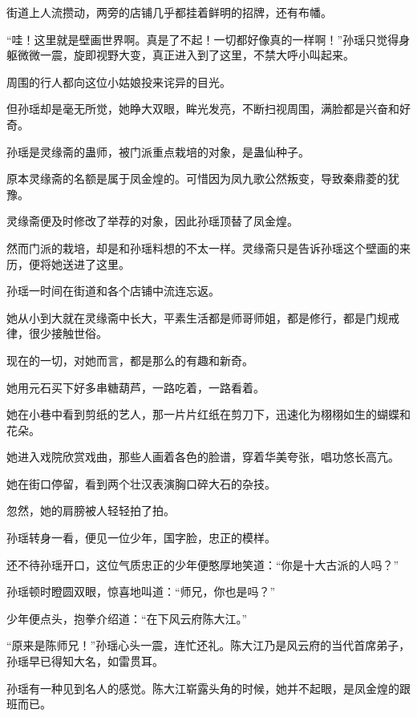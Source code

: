 
\begin{this_body}

街道上人流攒动，两旁的店铺几乎都挂着鲜明的招牌，还有布幡。

“哇！这里就是壁画世界啊。真是了不起！一切都好像真的一样啊！”孙瑶只觉得身躯微微一震，旋即视野大变，真正进入到了这里，不禁大呼小叫起来。

周围的行人都向这位小姑娘投来诧异的目光。

但孙瑶却是毫无所觉，她睁大双眼，眸光发亮，不断扫视周围，满脸都是兴奋和好奇。

孙瑶是灵缘斋的蛊师，被门派重点栽培的对象，是蛊仙种子。

原本灵缘斋的名额是属于凤金煌的。可惜因为凤九歌公然叛变，导致秦鼎菱的犹豫。

灵缘斋便及时修改了举荐的对象，因此孙瑶顶替了凤金煌。

然而门派的栽培，却是和孙瑶料想的不太一样。灵缘斋只是告诉孙瑶这个壁画的来历，便将她送进了这里。

孙瑶一时间在街道和各个店铺中流连忘返。

她从小到大就在灵缘斋中长大，平素生活都是师哥师姐，都是修行，都是门规戒律，很少接触世俗。

现在的一切，对她而言，都是那么的有趣和新奇。

她用元石买下好多串糖葫芦，一路吃着，一路看着。

她在小巷中看到剪纸的艺人，那一片片红纸在剪刀下，迅速化为栩栩如生的蝴蝶和花朵。

她进入戏院欣赏戏曲，那些人画着各色的脸谱，穿着华美夸张，唱功悠长高亢。

她在街口停留，看到两个壮汉表演胸口碎大石的杂技。

忽然，她的肩膀被人轻轻拍了拍。

孙瑶转身一看，便见一位少年，国字脸，忠正的模样。

还不待孙瑶开口，这位气质忠正的少年便憨厚地笑道：“你是十大古派的人吗？”

孙瑶顿时瞪圆双眼，惊喜地叫道：“师兄，你也是吗？”

少年便点头，抱拳介绍道：“在下风云府陈大江。”

“原来是陈师兄！”孙瑶心头一震，连忙还礼。陈大江乃是风云府的当代首席弟子，孙瑶早已得知大名，如雷贯耳。

孙瑶有一种见到名人的感觉。陈大江崭露头角的时候，她并不起眼，是凤金煌的跟班而已。


\end{this_body}
